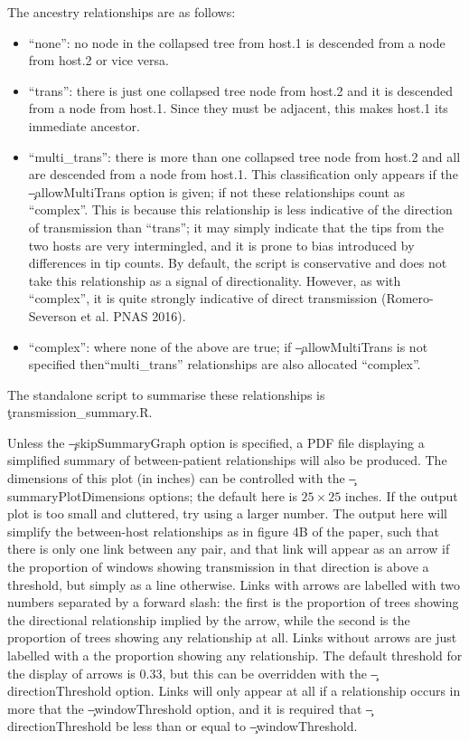The ancestry relationships are as follows:
\begin{itemize}
\item ``none'': no node in the collapsed tree from host.1 is descended from a node from host.2 or vice versa.
\item ``trans'': there is just one collapsed tree node from host.2 and it is descended from a node from host.1.
Since they must be adjacent, this makes host.1 its immediate ancestor.
\item ``multi\_trans'': there is more than one collapsed tree node from host.2 and all are descended from a node from host.1.
This classification only appears if the \c{--allowMultiTrans} option is given; if not these relationships count as ``complex''.
This is because this relationship is less indicative of the direction of transmission than ``trans''; it may simply indicate that the tips from the two hosts are very intermingled, and it is prone to bias introduced by differences in tip counts.
By default, the script is conservative and does not take this relationship as a signal of directionality.
However, as with ``complex'', it is quite strongly indicative of direct transmission (Romero-Severson et al. PNAS 2016).
\item ``complex'': where none of the above are true; if \c{--allowMultiTrans} is not specified then\break ``multi\_trans'' relationships are also allocated ``complex''.
\end{itemize}
The standalone script to summarise these relationships is \c{transmission\_summary.R}.

Unless the \c{--skipSummaryGraph} option is specified, a PDF file displaying a simplified summary of between-patient relationships will also be produced. The dimensions of this plot (in inches) can be controlled with the \c{--summaryPlotDimensions} options; the default here is $25\times25$ inches. If the output plot is too small and cluttered, try using a larger number. The output here will simplify the between-host relationships as in figure 4B of the \p paper, such that there is only one link between any pair, and that link will appear as an arrow if the proportion of windows showing transmission in that direction is above a threshold, but simply as a line otherwise. Links with arrows are labelled with two numbers separated by a forward slash: the first is the proportion of trees showing the directional relationship implied by the arrow, while the second is the proportion of trees showing any relationship at all. Links without arrows are just labelled with a the proportion showing any relationship. The default threshold for the display of arrows is 0.33, but this can be overridden with the \c{--directionThreshold} option. Links will only appear at all if a relationship occurs in more that the \c{--windowThreshold} option, and it is required that \c{--directionThreshold} be less than or equal to \c{--windowThreshold}.

